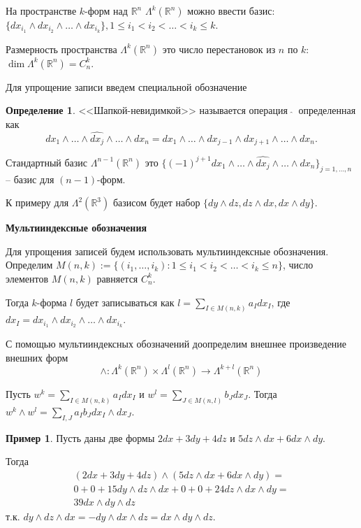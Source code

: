 \documentclass[a5paper]{article}
\newcounter{through}
\theoremstyle{plain}
\theoremstyle{definition}
\newtheorem{definition}[through]{Определение}
\newtheorem{example}[through]{Пример}
\numberwithin{through}{section}
\numberwithin{equation}{section}
\begin{document}
На пространстве $k$-форм над $\mathbb{R}^n$ $\Lambda^k(\mathbb{R}^n)$ можно ввести базис: $\{
dx_{i_1} \wedge dx_{i_2} \wedge\ldots\wedge dx_{i_k} \}, 1\leq i_1 < i_2 < \ldots < i_k \leq k$.

Размерность пространства $\Lambda^k(\mathbb{R}^n)$ это число перестановок из $n$ по $k$: $\dim \Lambda^k(\mathbb{R}^n) = 
C_n^k$.

Для упрощение записи введем специальной обозначение 

\begin{definition}
	<<Шапкой-невидимкой>> называется операция $\ \widehat{ } \ $ определенная как
	\[ dx_1 \wedge\ldots\wedge\widehat{dx_j}\wedge\ldots\wedge dx_n = dx_1 
	\wedge\ldots\wedge dx_{j-1}\wedge dx_{j+1}\wedge\ldots\wedge dx_n. \]
	
\end{definition}



Стандартный базис $\Lambda^{n-1}(\mathbb{R}^n)$ это 
$\{ (-1)^{j+1} dx_1\wedge\ldots\wedge \widehat{ dx_j } \wedge\ldots\wedge dx_n \}_{j = 1,\ldots,n}$
-- базис для $(n-1)$-форм.

К примеру для $\Lambda^2(\mathbb{R}^3)$ базисом будет набор $\{ dy\wedge dz, dz\wedge dx, dx\wedge dy \}$.

\medskip

\textbf{Мультииндексные обозначения}

Для упрощения записей будем использовать мультииндексные обозначения.
Определим $M(n,k) := \{ (i_1,\ldots,i_k): 1\leq i_1 < i_2 < \ldots < i_k \leq n \}$, число элементов
$M(n,k)$ равняется $C_n^k$.

Тогда $k$-форма $l$ будет записываться как $l = \sum\limits_{I \in M(n,k)} a_I dx_I$,
где $dx_I = dx_{i_{1}} \wedge dx_{i_{2}} \wedge\ldots\wedge dx_{i_{k}}$.

С помощью мультииндексных обозначений доопределим
внешнее произведение внешних форм
\[ \wedge : \Lambda^k(\mathbb{R}^n) \times 
\Lambda^l(\mathbb{R}^n) \to \Lambda^{k+l}(\mathbb{R}^n) \]

Пусть $w^k = \sum\limits_{I \in M(n,k)} a_I dx_I$ и 
$w^l = \sum\limits_{J \in M(n,l)} b_J dx_J$. Тогда
$ w^k \wedge w^l = \sum\limits_{I,J} a_Ib_J dx_I \wedge dx_J$.

\begin{example}
	Пусть даны две формы 
	$2dx+3dy+4dz$ и $5dz\wedge dx + 6dx\wedge dy$. 
	
	Тогда
	\begin{eqnarray}\nonumber
		(2dx+3dy+4dz)\wedge (5dz\wedge dx + 6dx\wedge dy) =
		\\\nonumber 0 + 0 + 15dy \wedge dz \wedge dx + 0 + 0 + 24dz \wedge dx \wedge dy  = 
		\\\nonumber 39dx \wedge dy \wedge dz 
	\end{eqnarray} т.к.
	$ dy \wedge dz \wedge dx = - dy \wedge dx \wedge dz = dx \wedge dy \wedge dz$.
\end{example}
\end{document}
